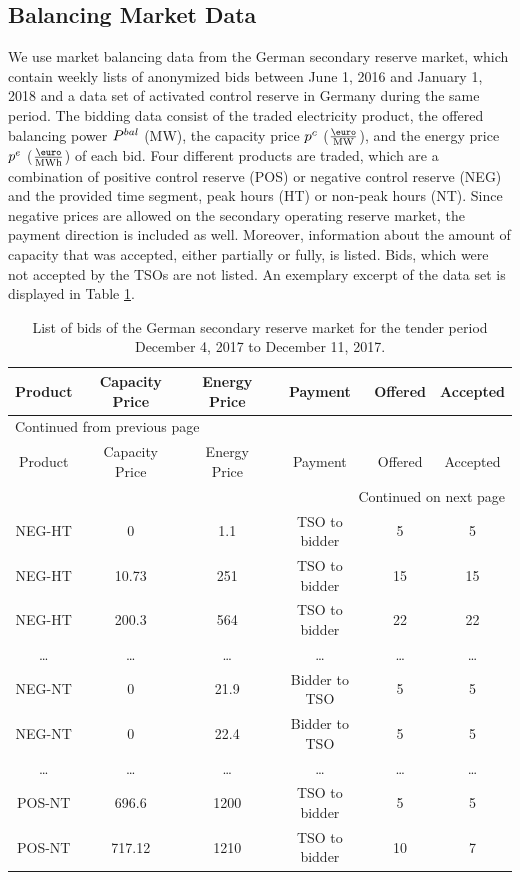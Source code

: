 \documentclass[a4paper, 12pt]{article}
\begin{document}
\subsection{Balancing Market Data \label{sec-data-balancing}}
\label{sec:orgbac91ca}
We use market balancing data from the German secondary reserve market, which
contain weekly lists of anonymized bids between June 1, 2016 and January 1, 2018 and a
data set of activated control reserve in Germany during the same period. The
bidding data consist of the traded electricity product, the offered balancing
power \(P^{bal}_{}\) (MW), the capacity price \(p^c_{}\) (\(\emw\)), and the energy price
\(p^e_{}\) (\(\emwh\)) of each bid. Four different products are traded, which are a
combination of positive control reserve (POS) or negative control reserve (NEG)
and the provided time segment, peak hours (HT) or non-peak hours (NT). Since
negative prices are allowed on the secondary operating reserve market, the
payment direction is included as well. Moreover, information about the amount of
capacity that was accepted, either partially or fully, is listed. Bids, which
were not accepted by the TSOs are not listed. An exemplary excerpt of the data
set is displayed in Table \ref{table-operating-reserve}.



\begin{longtable}{c|ccccc}
\caption[Secondary Operating Reserve Market Data]{List of bids of the German secondary reserve market for the tender period December 4, 2017 to December 11, 2017. \label{table-operating-reserve}}
\\
\hline
\hline
Product & Capacity Price & Energy Price & Payment & Offered & Accepted\\
\hline
\endfirsthead
\multicolumn{6}{l}{Continued from previous page} \\
\hline

Product & Capacity Price & Energy Price & Payment & Offered & Accepted \\

\hline
\endhead
\hline\multicolumn{6}{r}{Continued on next page} \\
\endfoot
\endlastfoot
\hline
NEG-HT & 0 & 1.1 & TSO to bidder & 5 & 5\\
NEG-HT & 10.73 & 251 & TSO to bidder & 15 & 15\\
NEG-HT & 200.3 & 564 & TSO to bidder & 22 & 22\\
\ldots{} & \ldots{} & \ldots{} & \ldots{} & \ldots{} & \ldots{}\\
NEG-NT & 0 & 21.9 & Bidder to TSO & 5 & 5\\
NEG-NT & 0 & 22.4 & Bidder to TSO & 5 & 5\\
\ldots{} & \ldots{} & \ldots{} & \ldots{} & \ldots{} & \ldots{}\\
POS-NT & 696.6 & 1200 & TSO to bidder & 5 & 5\\
POS-NT & 717.12 & 1210 & TSO to bidder & 10 & 7\\
\hline
\hline
\end{longtable}
\end{document}
